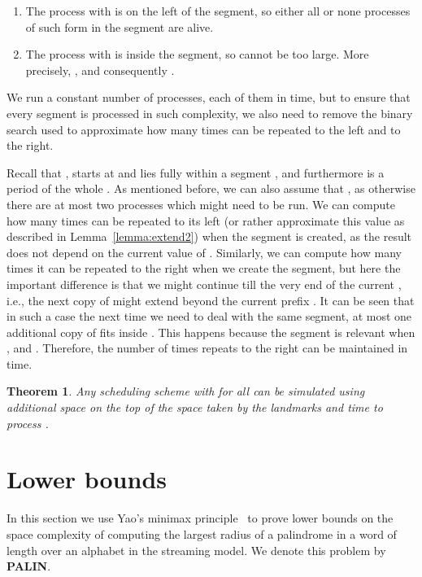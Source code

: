 \documentclass{article}[11pt,letter]
\newtheorem{theorem}[definition]{Theorem}
\newcommand{\ie}{i.e.\xspace}
\newcommand{\palin}[1][n]{{\bf PALIN}\xspace}
\begin{document}
\begin{enumerate}
\item The process  with  is on the left of the segment, so either all or none
processes of such form in the segment are alive.
\item The process  with  is inside the segment, so  cannot be too large.
More precisely, , and consequently .
\end{enumerate}

We run a constant number of processes, each of them in  time, but to ensure that every segment is processed in such
complexity, we also need to remove the binary search used to approximate how
many times  can be repeated to the left and to the right.

Recall that ,  starts at  and lies
fully within a segment , and furthermore  is a period of the whole . As mentioned before, we can also assume that ,
as otherwise there are at most two processes which might need to be run. We can compute how many times  can be repeated to
its left (or rather approximate this value as described in Lemma~\ref{lemma:extend2}) when the segment is created, as the result
does not depend on the current value of .
Similarly, we can compute how many times it can be repeated to the right when we create the segment, but here the important
difference is that we might continue till the very end of the current , \ie, the next copy of  might extend beyond the
current prefix . It can be seen that in such a case the next time we need to deal with the same segment, at most one
additional copy of  fits inside . This happens because the segment is relevant when , and
. Therefore, the number of times  repeats to the right can be maintained in  time.

\begin{theorem}
\label{thm:time_efficient}
Any scheduling scheme with  for all 
can be simulated using  additional space on the top of the
space taken by the landmarks and  time to process .
\end{theorem}

\section{Lower bounds}
\label{section:lowerbounds}

In this section we use Yao's minimax principle~\cite{Yao77} to prove
lower bounds on the space complexity of computing the largest radius of a palindrome in a word
of length  over an alphabet  in the streaming model. We denote this problem
by \palin.
\end{document}
